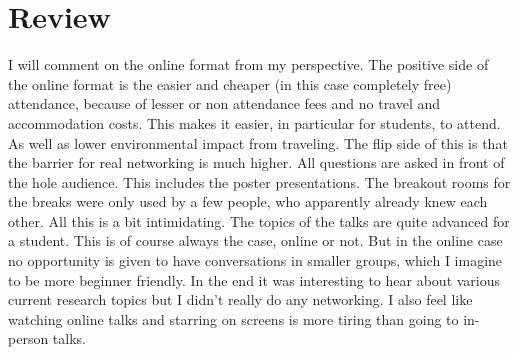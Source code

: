 \documentclass[a4paper]{article}
\begin{document}
\section{Review}
I will comment on the online format from my perspective.
The positive side of the online format is the easier and cheaper (in this case completely free)
attendance, because of lesser or non attendance fees and no travel and accommodation costs.
This makes it easier, in particular for students, to attend. As well as lower environmental impact from traveling.
The flip side of this is that the barrier for real networking is much higher.
All questions are asked in front of the hole audience. This includes the
poster presentations. The breakout rooms for the breaks were only used by a few people, who apparently already knew
each other.
All this is a bit intimidating.
The topics of the talks are quite advanced for a student.
This is of course always the case, online or not. But in the online case no opportunity is given to have
conversations in smaller groups, which I imagine to be more beginner friendly.
In the end it was interesting to hear about various current research topics but
I didn't really do any networking.
I also feel like watching online talks and starring on screens is more tiring than going to in-person talks.


\newpage
\printbibliography
\end{document}
